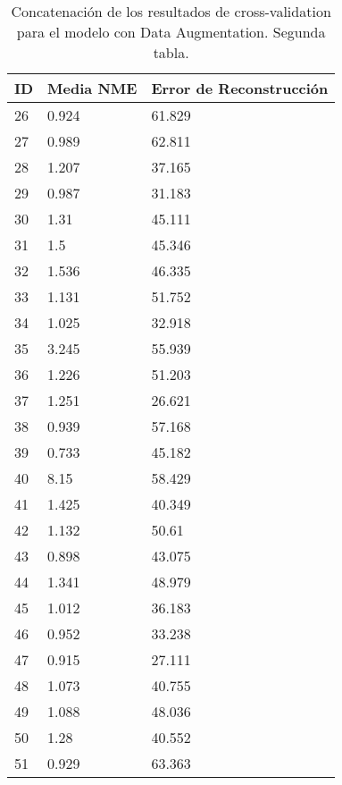 \begin{table}[!ht]
    \centering
    \caption{Concatenación de los resultados de cross-validation para el modelo con Data Augmentation. Segunda tabla.}
    \begin{tabular}{|l|l|l|}
    \hline
    \cellcolor{gray!25}\textbf{ID} & \cellcolor{gray!25}\textbf{Media NME} & \cellcolor{gray!25}\textbf{Error de Reconstrucción} \\ \hline
        26 & 0.924 & 61.829 \\ \hline
        27 & 0.989 & 62.811 \\ \hline
        28 & 1.207 & 37.165 \\ \hline
        29 & 0.987 & 31.183 \\ \hline
        30 & 1.31 & 45.111 \\ \hline
        31 & 1.5 & 45.346 \\ \hline
        32 & 1.536 & 46.335 \\ \hline
        33 & 1.131 & 51.752 \\ \hline
        34 & 1.025 & 32.918 \\ \hline
        35 & 3.245 & 55.939 \\ \hline
        36 & 1.226 & 51.203 \\ \hline
        37 & 1.251 & 26.621 \\ \hline
        38 & 0.939 & 57.168 \\ \hline
        39 & 0.733 & 45.182 \\ \hline
        40 & 8.15 & 58.429 \\ \hline
        41 & 1.425 & 40.349 \\ \hline
        42 & 1.132 & 50.61 \\ \hline
        43 & 0.898 & 43.075 \\ \hline
        44 & 1.341 & 48.979 \\ \hline
        45 & 1.012 & 36.183 \\ \hline
        46 & 0.952 & 33.238 \\ \hline
        47 & 0.915 & 27.111 \\ \hline
        48 & 1.073 & 40.755 \\ \hline
        49 & 1.088 & 48.036 \\ \hline
        50 & 1.28 & 40.552 \\ \hline
        51 & 0.929 & 63.363 \\ \hline
    \end{tabular}
\end{table}

